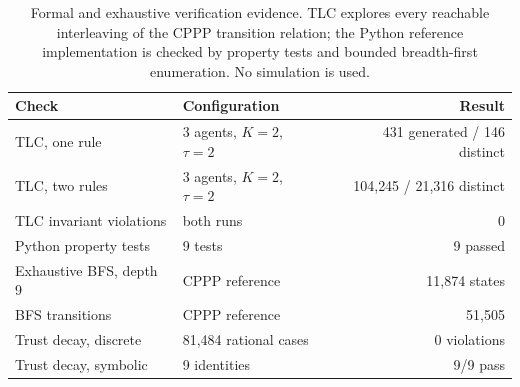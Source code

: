 \begin{table}[t]
\centering
\caption{Formal and exhaustive verification evidence. TLC explores every
reachable interleaving of the CPPP transition relation; the Python reference
implementation is checked by property tests and bounded breadth-first
enumeration. No simulation is used.}
\label{tab:formal}
\small
\begin{tabular}{llr}
\toprule
Check & Configuration & Result \\
\midrule
TLC, one rule & 3 agents, $K=2$, $\tau=2$ & 431 generated / 146 distinct \\
TLC, two rules & 3 agents, $K=2$, $\tau=2$ & 104{,}245 / 21{,}316 distinct \\
TLC invariant violations & both runs & 0 \\
Python property tests & 9 tests & 9 passed \\
Exhaustive BFS, depth 9 & CPPP reference & 11{,}874 states \\
BFS transitions & CPPP reference & 51{,}505 \\
Trust decay, discrete & 81{,}484 rational cases & 0 violations \\
Trust decay, symbolic & 9 identities & 9/9 pass \\
\bottomrule
\end{tabular}
\end{table}
